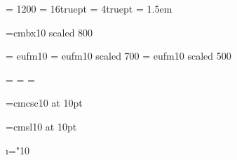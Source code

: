 \magnification = 1200
\baselineskip  = 16truept
\parskip       = 4truept
\parindent     = 1.5em

\font\vcmr=cmbx10 scaled 800

\font\xeufm   = eufm10
\font\viieufm = eufm10 scaled 700
\font\veufm   = eufm10 scaled 500

\newfam\frakfam
\textfont\frakfam         = \xeufm
\scriptfont\frakfam       = \viieufm
\scriptscriptfont\frakfam = \veufm
\def\frak{\fam\frakfam\xeufm}

\font\spft=cmcsc10 at 10pt

\font\secfont=cmsl10 at 10pt

\chardef\i="10


\def\cp{\mathbin{\neg}}
\def\ra{\rightarrow}
\def\a{\wedge}
\def\d{\wedge}
\def\dom{{\frak D}\kern.2ex}
\def\img{{\frak I}\kern.2ex}
\def\U{{\cal U}}
\def\fnc{{\frak F}}
\def\qed{%
  \ \hfill{/\kern -2.5pt/\kern -2.5pt/} %
  \bigskip
}
\def\rel#1{%
  \mathbin{#1}
}

\def\section#1{%
  \null
  \vskip .5cm
  \noindent\hfill{\secfont #1}\hfill\null
  \vskip .25cm
  \null
}


\newcount\proclaimcounter
\long{}

\def\prova{%
  \noindent
  {\it Prova}
  \quad
}

\def\fig#1#2{
  \vskip .5cm
  \line{\hfil#1\hfil}
  \vskip 20pt
  \line{%
    \hfil
    Figura: #2
    \hfil
  }
  \vskip .5cm
}

